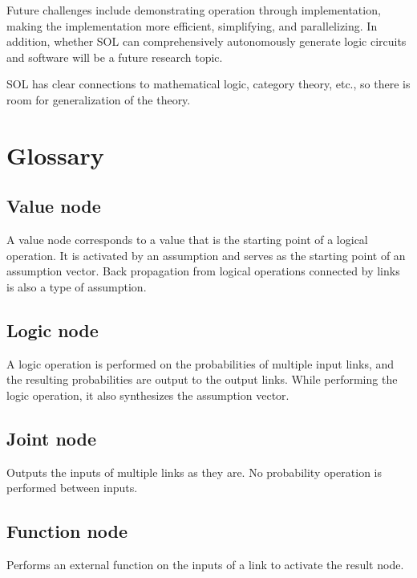 \documentclass[12pt]{article}
\begin{document}
Future challenges include demonstrating operation through
implementation, making the implementation more efficient, simplifying,
and parallelizing. In addition, whether SOL can comprehensively
autonomously generate logic circuits and software will be a future
research topic.

SOL has clear connections to mathematical logic, category theory, etc.,
so there is room for generalization of the theory.

\clearpage

\section{Glossary}\label{glossary}

\subsection*{Value node}\label{glossary-value-node}

A value node corresponds to a value that is the starting point of a
logical operation. It is activated by an assumption and serves as the
starting point of an assumption vector. Back propagation from logical
operations connected by links is also a type of assumption.

\subsection*{Logic node}\label{glossary-logic-node}

A logic operation is performed on the probabilities of multiple input
links, and the resulting probabilities are output to the output links.
While performing the logic operation, it also synthesizes the assumption
vector.

\subsection*{Joint node}\label{glossary-joint-node}

Outputs the inputs of multiple links as they are. No probability
operation is performed between inputs.

\subsection*{Function node}\label{glossary-function-node}

Performs an external function on the inputs of a link to activate the
result node.
\end{document}
